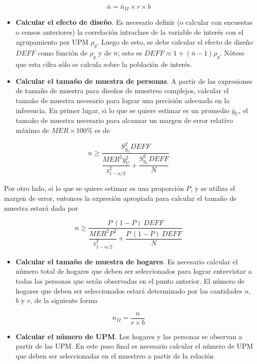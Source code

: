 \documentclass[
  12pt,
  spanish,
]{book}
\providecommand{\tightlist}{%
  \setlength{\itemsep}{0pt}\setlength{\parskip}{0pt}}
\begin{document}
\[
\bar{n} = \bar{n}_{II} \times r \times b
\]

\begin{itemize}
\item
  \textbf{Calcular el efecto de diseño}. Es necesario definir (o calcular con encuestas o censos anteriores) la correlación intraclase de la variable de interés con el agrupamiento por UPM \(\rho_y\). Luego de esto, se debe calcular el efecto de diseño \(DEFF\) como función de \(\rho_y\) y de \(\bar{n}\); esto es \(DEFF \approx 1 + (\bar{n} - 1)\rho_y\). Nótese que esta cifra sólo se calcula sobre la población de interés.
\item
  \textbf{Calcular el tamaño de muestra de personas}. A partir de las expresiones de tamaño de muestra para diseños de muestreo complejos, calcular el tamaño de muestra necesario para lograr una precisión adecuada en la inferencia. En primer lugar, si lo que se quiere estimar es un promedio \(\bar{y}_U\), el tamaño de muestra necesario para alcanzar un margen de error relativo máximo de \(MER \times 100\%\) es de
\end{itemize}

\[
n \geq \dfrac{S^2_{y_U}DEFF}{\dfrac{MER^2 \bar{y}_U^2}{z_{1 - \alpha/2}^2}+\dfrac{S^2_{y_U}DEFF}{N}}
\]

Por otro lado, si lo que se quiere estimar es una proporción \(P\), y se utiliza el margen de error, entonces la expresión apropiada para calcular el tamaño de muestra estará dada por

\[
n \geq \dfrac{P\ (1-P)\ DEFF}{\dfrac{MER^2P^2}{z_{1-\alpha/2}^2}+\dfrac{P\ (1-P) \ DEFF}{N}}
\]

\begin{itemize}
\tightlist
\item
  \textbf{Calcular el tamaño de muestra de hogares}. Es necesario calcular el número total de hogares que deben ser seleccionados para lograr entrevistar a todas las personas que serán observadas en el punto anterior. El número de hogares que deben ser seleccionados estará determinado por las cantidades \(n\), \(b\) y \(r\), de la siguiente forma
\end{itemize}

\[
n_{II} = \dfrac{n}{r \times b}
\]

\begin{itemize}
\tightlist
\item
  \textbf{Calcular el número de UPM}. Los hogares y las personas se observan a partir de las UPM. En este paso final es necesario calcular el número de UPM que deben ser seleccionadas en el muestreo a partir de la relación
\end{itemize}
\end{document}
